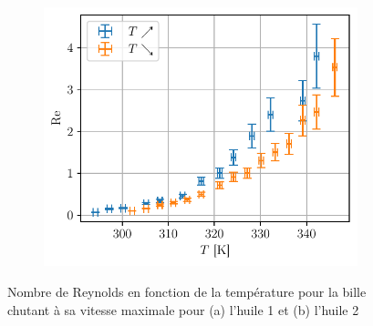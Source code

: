 \begin{figure}[H]
\begin{subfigure}{0.48\linewidth}
        \includegraphics[width=\linewidth]{figures/huile2_Re.pdf}
        \caption{}
        \label{fig:huile2_Re}
    \end{subfigure}
    \caption{Nombre de Reynolds en fonction de la température pour la bille chutant à sa vitesse maximale pour (a) l'huile 1 et (b) l'huile 2}
\end{figure}

